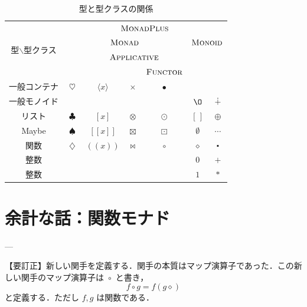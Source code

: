 \documentclass[a4paper,twocolumn]{jsbook}
\def\[{\left[\!\left[}
\def\]{\right]\!\right]}
\def\({\left(\!\left(}
\def\){\right)\!\right)}
\newcommand{\mEmptyList}{{[\,]}}
\newcommand{\mNothing}{\emptyset}
\newcommand{\mZero}{\O}
\newcommand{\mAnonParam}{\diamond}
\DeclareMathOperator{\mAppend}{\oplus}
\DeclareMathOperator{\mAppMap}{\times}
\DeclareMathOperator{\mAppMapFunc}{\bowtie}
\DeclareMathOperator{\mAppMapList}{\otimes}
\DeclareMathOperator{\mAppMapMaybe}{\boxtimes}
\DeclareMathOperator{\mBind}{\heartsuit}
\DeclareMathOperator{\mBindFunc}{\diamondsuit}
\DeclareMathOperator{\mBindList}{\clubsuit}
\DeclareMathOperator{\mBindMaybe}{\spadesuit}
\DeclareMathOperator{\mComp}{\centerdot}
\DeclareMathOperator{\mMap}{\bullet}
\DeclareMathOperator{\mMapFunc}{\circ}
\DeclareMathOperator{\mMapList}{\odot}
\DeclareMathOperator{\mMapMaybe}{\boxdot}
\DeclareMathOperator{\mPlus}{\dotplus}
\newcommand{\mFuncWith}[1]{\(#1\)}
\newcommand{\mListWith}[1]{\left[#1\right]}
\newcommand{\mMaybeWith}[1]{\[#1\]}
\newcommand{\mPureWith}[1]{\langle#1\rangle}
\newcommand{\mSpecialTypeClass}[1]{\textsc{#1}} %
\newcommand{\mApplicativeTypeClass}{\mSpecialTypeClass{Applicative}}
\newcommand{\mFunctorTypeClass}{\mSpecialTypeClass{Functor}}
\newcommand{\mMonadTypeClass}{\mSpecialTypeClass{Monad}}
\newcommand{\mMonadPlusTypeClass}{\mSpecialTypeClass{MonadPlus}}
\newcommand{\mMonoidTypeClass}{\mSpecialTypeClass{Monoid}}
\begin{document}



\begin{table}
\label{tab:monadplus}
\caption{型と型クラスの関係}
\begin{center}
\begin{tabular}{||c||c|c|c|c|c|c||}
\hline
\multirow{4}{*}{型$\backslash$型クラス}
  &\multicolumn{6}{|c||}{$\mMonadPlusTypeClass$}\\
\cline{2-7}
\multirow{3}{*}{}
  &\multicolumn{4}{|c|}{$\mMonadTypeClass$}
  &\multicolumn{2}{|c||}{$\mMonoidTypeClass$}\\
\cline{3-5}
\multirow{2}{*}{}
  &
  &\multicolumn{3}{|c|}{$\mApplicativeTypeClass$}
  &\multicolumn{2}{|c||}{}\\
\cline{5-5}
\multirow{1}{*}{}
  &
  &\multicolumn{2}{|c|}{}
  &$\mFunctorTypeClass$
  &\multicolumn{2}{|c||}{}\\
\hline\hline
一般コンテナ
  &$\mBind$
  &$\mPureWith{x}$
  &$\mAppMap$
  &$\mMap$
  &
  &\\
\hline
一般モノイド
  &
  &
  &
  &
  &$\mZero$
  &$\mPlus$\\
\hline
リスト
  &$\mBindList$
  &$\mListWith{x}$
  &$\mAppMapList$
  &$\mMapList$
  &$\mEmptyList$
  &$\mAppend$\\
\hline
Maybe
  &$\mBindMaybe$
  &$\mMaybeWith{x}$
  &$\mAppMapMaybe$
  &$\mMapMaybe$
  &$\mNothing$
  &$\dotsb$\\
\hline
関数
  &$\mBindFunc$
  &$\mFuncWith{x}$
  &$\mAppMapFunc$
  &$\mMapFunc$
  &$\mAnonParam$
  &$\mComp$\\
\hline
整数
  &
  &
  &
  &
  &$0$
  &$+$\\
\hline  
整数
  &
  &
  &
  &
  &$1$
  &$*$\\
\hline  
\end{tabular}
\end{center}
\end{table}

\section{余計な話：関数モナド}

---

【要訂正】新しい関手を定義する．関手の本質はマップ演算子であった．この新しい関手のマップ演算子は $\mMapFunc$ と書き， 
\begin{equation}
\label{eq:def-of-map-func}
f\mMapFunc g=f(g\mAnonParam)
\end{equation}
と定義する．ただし $f,g$ は関数である．
\end{document}
